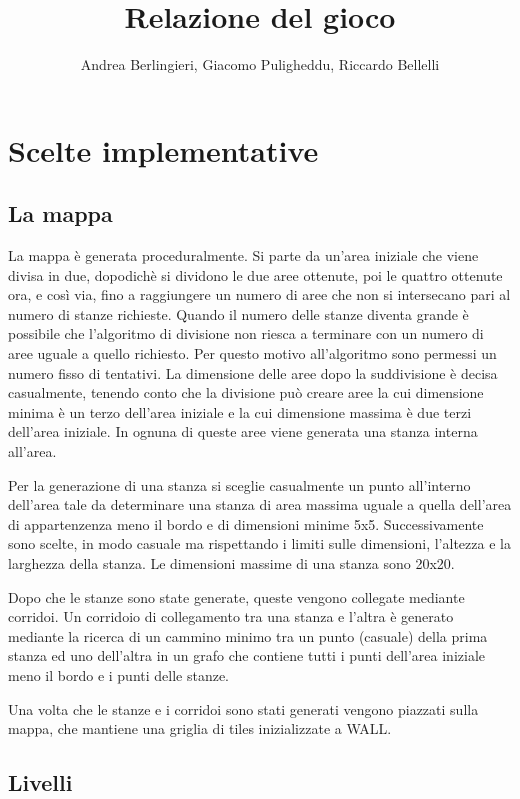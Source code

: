 \documentclass[10pt]{report}
\title{Relazione del gioco}
\author{Andrea Berlingieri, 
	Giacomo Puligheddu, 
	Riccardo Bellelli}
\date{}
\begin{document}
\maketitle
\tableofcontents

\chapter{Scelte implementative}

\section{La mappa}

La mappa è generata proceduralmente. Si parte da un'area iniziale che viene divisa in due, dopodichè si
dividono le due aree ottenute, poi le quattro ottenute ora, e così via, fino a raggiungere un numero di aree
che non si intersecano pari al numero di stanze richieste. Quando il numero delle stanze diventa grande è
possibile che l'algoritmo di divisione non riesca a terminare con un numero di aree uguale a quello richiesto.
Per questo motivo all'algoritmo sono permessi un numero fisso di tentativi. La dimensione delle aree dopo la
suddivisione è decisa casualmente, tenendo conto che la divisione può creare aree la cui dimensione minima
è un terzo dell'area iniziale e la cui dimensione massima è due terzi dell'area iniziale.  
In ognuna di queste aree viene generata una stanza interna all'area.

Per la generazione di una stanza si sceglie casualmente un punto all'interno dell'area tale da determinare una
stanza di area massima uguale a quella dell'area di appartenzenza meno il bordo e di dimensioni minime 5x5.
Successivamente sono scelte, in modo casuale ma rispettando i limiti sulle dimensioni, l'altezza e la
larghezza della stanza. Le dimensioni massime di una stanza sono 20x20.

Dopo che le stanze sono state generate, queste vengono collegate mediante corridoi. Un corridoio di
collegamento tra una stanza e l'altra è generato mediante la ricerca di un cammino minimo tra un punto
(casuale) della prima stanza ed uno dell'altra in un grafo che contiene tutti i punti dell'area iniziale meno
il bordo e i punti delle stanze. 

Una volta che le stanze e i corridoi sono stati generati vengono piazzati sulla mappa, che mantiene una
griglia di tiles inizializzate a WALL. 

\section{Livelli}
\end{document}
